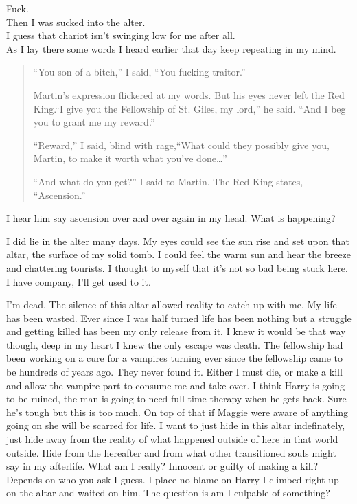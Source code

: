 Fuck.\\

Then I was sucked into the alter.\\

I guess that chariot isn't swinging low for me after all.\\

As I lay there some words I heard earlier that day keep repeating in my mind.

\begin{quotation}
	``You son of a bitch,'' I said, ``You fucking traitor.''
	
	Martin’s expression flickered at my words. But his eyes never left the Red King.``I give you the Fellowship of St. Giles, my lord,'' he said. ``And I beg you to grant me my reward.''
	
	``Reward,'' I said, blind with rage,``What could they possibly give you, Martin, to make it worth what you’ve done\dots''

	``And what do you get?'' I said to Martin.
	The Red King states, ``Ascension.''
\end{quotation}

I hear him say ascension over and over again in my head. What is happening? 

I did lie in the alter many days. My eyes could see the sun rise and set upon that altar, the surface of my solid tomb. I could feel the warm sun and hear the breeze and chattering tourists. I thought to myself that it's not so bad being stuck here. I have company, I'll get used to it.

I'm dead. The silence of this altar allowed reality to catch up with me. My life has been wasted. Ever since I was half turned life has been nothing but a struggle and getting killed has been my only release from it. I knew it would be that way though, deep in my heart I knew the only escape was death. The fellowship had been working on a cure for a vampires turning ever since the fellowship came to be hundreds of years ago. They never found it. Either I must die, or make a kill and allow the vampire part to consume me and take over. I think Harry is going to be ruined, the man is going to need full time therapy when he gets back. Sure he's tough but this is too much. On top of that if Maggie were aware of anything going on she will be scarred for life. I want to just hide in this altar indefinately, just hide away from the reality of what happened outside of here in that world outside. Hide from the hereafter and from what other transitioned souls might say in my afterlife. What am I really? Innocent or guilty of making a kill? Depends on who you ask I guess. I place no blame on Harry I climbed right up on the altar and waited on him. The question is am I culpable of something?

